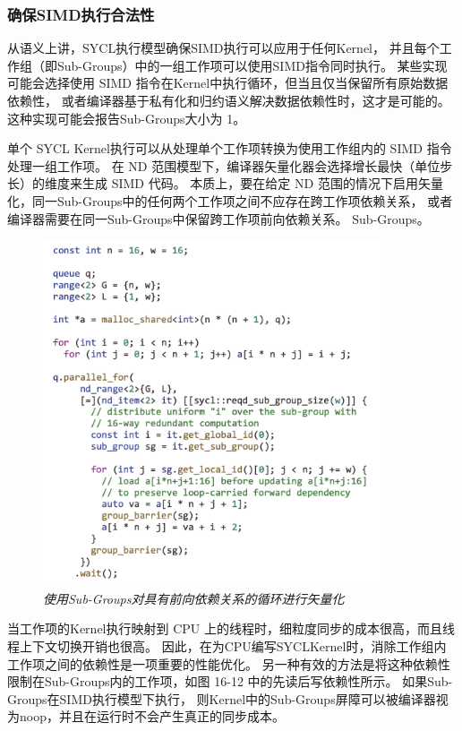 \subsubsection{确保SIMD执行合法性}
从语义上讲，SYCL执行模型确保SIMD执行可以应用于任何Kernel，
并且每个工作组（即Sub-Groups）中的一组工作项可以使用SIMD指令同时执行。 
某些实现可能会选择使用 SIMD 指令在Kernel中执行循环，但当且仅当保留所有原始数据依赖性，
或者编译器基于私有化和归约语义解决数据依赖性时，这才是可能的。 这种实现可能会报告Sub-Groups大小为 1。

单个 SYCL Kernel执行可以从处理单个工作项转换为使用工作组内的 SIMD 指令处理一组工作项。 
在 ND 范围模型下，编译器矢量化器会选择增长最快（单位步长）的维度来生成 SIMD 代码。 
本质上，要在给定 ND 范围的情况下启用矢量化，同一Sub-Groups中的任何两个工作项之间不应存在跨工作项依赖关系，
或者编译器需要在同一Sub-Groups中保留跨工作项前向依赖关系。 Sub-Groups。

\begin{figure}[H]
	\centering
	\includegraphics[width=0.9\textwidth]{figs/F16.12.png}
	\caption{\textit{使用Sub-Groups对具有前向依赖关系的循环进行矢量化 }}
\end{figure}

当工作项的Kernel执行映射到 CPU 上的线程时，细粒度同步的成本很高，而且线程上下文切换开销也很高。 
因此，在为CPU编写SYCLKernel时，消除工作组内工作项之间的依赖性是一项重要的性能优化。 
另一种有效的方法是将这种依赖性限制在Sub-Groups内的工作项，如图 16-12 中的先读后写依赖性所示。 
如果Sub-Groups在SIMD执行模型下执行，
则Kernel中的Sub-Groups屏障可以被编译器视为noop，并且在运行时不会产生真正的同步成本。

